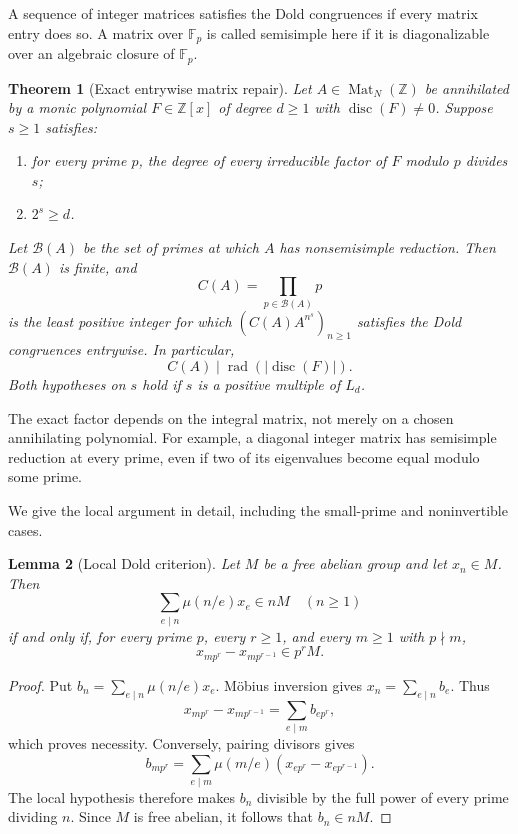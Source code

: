 \documentclass[11pt]{article}
\newtheorem{theorem}{Theorem}
\newtheorem{lemma}[theorem]{Lemma}
\theoremstyle{remark}
\newcommand{\rad}{\operatorname{rad}}
\newcommand{\disc}{\operatorname{disc}}
\newcommand{\Mat}{\operatorname{Mat}}
\begin{document}
A sequence of integer matrices satisfies the Dold congruences if every matrix entry does so. A matrix over $\mathbb F_p$ is called semisimple here if it is diagonalizable over an algebraic closure of $\mathbb F_p$.

\begin{theorem}[Exact entrywise matrix repair]\label{thm:matrix}
Let $A\in\Mat_N(\mathbb Z)$ be annihilated by a monic polynomial $F\in\mathbb Z[x]$ of degree $d\geq1$ with $\disc(F)\neq0$. Suppose $s\geq1$ satisfies:
\begin{enumerate}
\item for every prime $p$, the degree of every irreducible factor of $F$ modulo $p$ divides $s$;
\item $2^s\geq d$.
\end{enumerate}
Let $\mathcal B(A)$ be the set of primes at which $A$ has nonsemisimple reduction. Then $\mathcal B(A)$ is finite, and
\[
 C(A)=\prod_{p\in\mathcal B(A)}p
\]
is the least positive integer for which $(C(A)A^{n^s})_{n\geq1}$ satisfies the Dold congruences entrywise. In particular,
\[
 C(A)\mid\rad(|\disc(F)|).
\]
Both hypotheses on $s$ hold if $s$ is a positive multiple of $L_d$.
\end{theorem}

The exact factor depends on the integral matrix, not merely on a chosen annihilating polynomial. For example, a diagonal integer matrix has semisimple reduction at every prime, even if two of its eigenvalues become equal modulo some prime.

We give the local argument in detail, including the small-prime and noninvertible cases.

\begin{lemma}[Local Dold criterion]\label{lem:local}
Let $M$ be a free abelian group and let $x_n\in M$. Then
\[
 \sum_{e\mid n}\mu(n/e)x_e\in nM\quad(n\geq1)
\]
if and only if, for every prime $p$, every $r\geq1$, and every $m\geq1$ with $p\nmid m$,
\[
 x_{mp^r}-x_{mp^{r-1}}\in p^r M.
\]
\end{lemma}
\begin{proof}
Put $b_n=\sum_{e\mid n}\mu(n/e)x_e$. M\"obius inversion gives $x_n=\sum_{e\mid n}b_e$. Thus
\[
 x_{mp^r}-x_{mp^{r-1}}=\sum_{e\mid m}b_{ep^r},
\]
which proves necessity. Conversely, pairing divisors gives
\[
 b_{mp^r}=\sum_{e\mid m}\mu(m/e)
      (x_{ep^r}-x_{ep^{r-1}}).
\]
The local hypothesis therefore makes $b_n$ divisible by the full power of every prime dividing $n$. Since $M$ is free abelian, it follows that $b_n\in nM$.
\end{proof}
\end{document}
